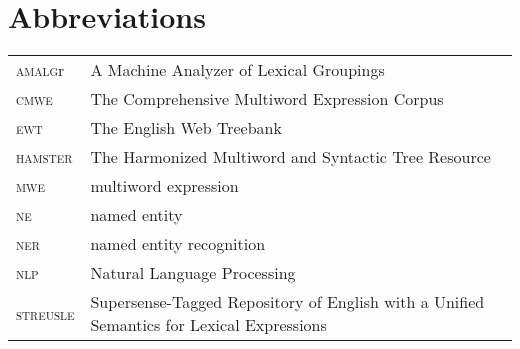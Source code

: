 \documentclass[output=paper,modfonts,nonflat]{langsci/langscibook}
\begin{document}
\section*{Abbreviations}

\begin{tabularx}{\textwidth}{lQ}
\textsc{amalg}r & A Machine Analyzer of Lexical Groupings\\
\textsc{cmwe}  & The Comprehensive Multiword Expression Corpus\\
\textsc{ewt} & The English Web Treebank\\
\textsc{hamster} & The Harmonized Multiword and Syntactic Tree Resource\\
\textsc{mwe} & multiword expression \\
\textsc{ne} & named entity \\
\textsc{ner} & named entity recognition\\
\textsc{nlp}& Natural Language Processing \\
\textsc{streusle}  & Supersense-Tagged Repository of English with a   Unified  Semantics for Lexical Expressions \\
\end{tabularx}
 
{\sloppy
\printbibliography[heading=subbibliography,notkeyword=this]
}

\clearpage
\end{document}
